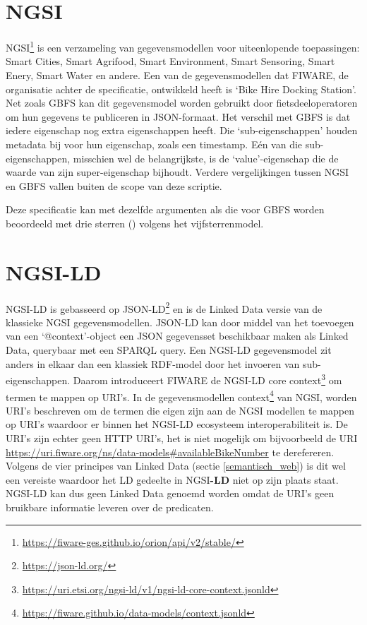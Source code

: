 \section{NGSI}
\label{sec:ngsi}
NGSI\footnote{\url{https://fiware-ges.github.io/orion/api/v2/stable/}} is een verzameling van gegevensmodellen voor uiteenlopende toepassingen: Smart Cities, Smart Agrifood, Smart Environment, Smart Sensoring, Smart Enery, Smart Water en andere. Een van de gegevensmodellen dat FIWARE, de organisatie achter de specificatie, ontwikkeld heeft is `Bike Hire Docking Station'. Net zoals GBFS kan dit gegevensmodel worden gebruikt door fietsdeeloperatoren om hun gegevens te publiceren in JSON-formaat. Het verschil met GBFS is dat iedere eigenschap nog extra eigenschappen heeft. Die `sub-eigenschappen' houden metadata bij voor hun eigenschap, zoals een timestamp. Eén van die sub-eigenschappen, misschien wel de belangrijkste, is de `value'-eigenschap die de waarde van zijn super-eigenschap bijhoudt. Verdere vergelijkingen tussen NGSI en GBFS vallen buiten de scope van deze scriptie.

Deze specificatie kan met dezelfde argumenten als die voor GBFS worden beoordeeld met drie sterren (\ast \ast \ast) volgens het vijfsterrenmodel.

\section{NGSI-LD}
\label{sec:ngsi-ld}
NGSI-LD is gebasseerd op JSON-LD\footnote{\url{https://json-ld.org/}} en is de Linked Data versie van de klassieke NGSI gegevensmodellen. JSON-LD kan door middel van het toevoegen van een `@context'-object een JSON gegevensset beschikbaar maken als Linked Data, querybaar met een SPARQL query.
Een NGSI-LD gegevensmodel zit anders in elkaar dan een klassiek RDF-model door het invoeren van sub-eigenschappen. Daarom introduceert FIWARE de NGSI-LD core context\footnote{\url{https://uri.etsi.org/ngsi-ld/v1/ngsi-ld-core-context.jsonld}} om termen te mappen op URI's. In de gegevensmodellen context\footnote{\url{https://fiware.github.io/data-models/context.jsonld}} van NGSI, worden URI's beschreven om de termen die eigen zijn aan de NGSI modellen te mappen op URI's waardoor er binnen het NGSI-LD ecosysteem interoperabiliteit is. De URI's zijn echter geen HTTP URI's, het is niet mogelijk om bijvoorbeeld de URI \url{https://uri.fiware.org/ns/data-models#availableBikeNumber} te derefereren. Volgens de vier principes van Linked Data (sectie \ref{semantisch_web}) is dit wel een vereiste waardoor het LD gedeelte in NGSI\textbf{-LD} niet op zijn plaats staat. NGSI-LD kan dus geen Linked Data genoemd worden omdat de URI's geen bruikbare informatie leveren over de predicaten.

